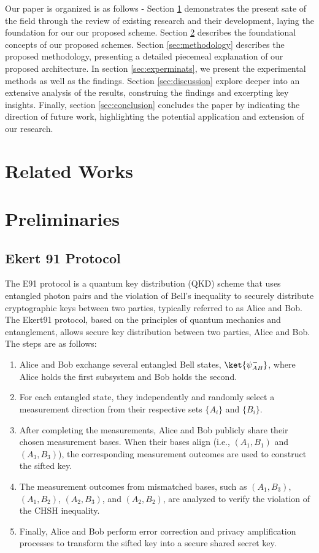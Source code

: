 \documentclass{article}
\begin{document}
Our paper is organized is as follows - Section \ref{sec:relatedWorks} demonstrates the present sate of the field through the review of existing research and their development, laying the foundation for our our proposed scheme. Section \ref{sec:preliminaries} describes the foundational concepts of our proposed schemes. Section \ref{sec:methodology} describes the proposed methodology, presenting a detailed piecemeal explanation of our proposed architecture. In section \ref{sec:experminats}, we present the experimental methods as well as the findings. Section \ref{sec:discussion} explore deeper into an extensive analysis of the results, construing the findings and excerpting key insights. Finally, section \ref{sec:conclusion} concludes the paper by indicating the direction of future work, highlighting the potential application and extension of our research.
\section{Related Works}
\label{sec:relatedWorks}

\section{Preliminaries}
\label{sec:preliminaries}
\subsection{Ekert 91 Protocol}
\label{sec:e91}
The E91 protocol is a quantum key distribution (QKD) scheme that uses entangled photon pairs and the violation of Bell's inequality to securely distribute cryptographic keys between two parties, typically referred to as Alice and Bob.
The Ekert91 protocol, based on the principles of quantum mechanics and entanglement, allows secure key distribution between two parties, Alice and Bob. The steps are as follows:

\begin{enumerate}
    \item Alice and Bob exchange several entangled Bell states, $\ket{\psi^{-}_{AB}}$, where Alice holds the first subsystem and Bob holds the second.
    \item For each entangled state, they independently and randomly select a measurement direction from their respective sets $\{A_i\}$ and $\{B_i\}$.
    \item After completing the measurements, Alice and Bob publicly share their chosen measurement bases. When their bases align (i.e., $(A_1, B_1)$ and $(A_3, B_3)$), the corresponding measurement outcomes are used to construct the sifted key.
    \item The measurement outcomes from mismatched bases, such as $(A_1, B_3)$, $(A_1, B_2)$, $(A_2, B_3)$, and $(A_2, B_2)$, are analyzed to verify the violation of the CHSH inequality.
    \item Finally, Alice and Bob perform error correction and privacy amplification processes to transform the sifted key into a secure shared secret key.
\end{enumerate}
\end{document}
